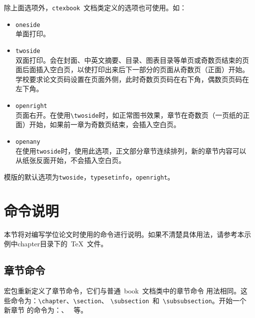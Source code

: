 除上面选项外，\texttt{ctexbook}~文档类定义的选项也可使用。如：
\begin{itemize}
\item \verb|oneside|\\
	单面打印。
\item \verb|twoside|\\
	双面打印。会在封面、中英文摘要、目录、图表目录等单页或奇数页结束的页面后面插入空白页，以使打印出来后下一部分的页面从奇数页（正面）开始。
	学校要求论文页码设置在页面外侧，此时奇数页页码在右下角，偶数页页码在左下角。
\item \verb|openright|\\
	页面右开。在使用\verb|\twoside|时，如正常图书效果，章节在奇数页（一页纸的正面）开始，如果前一章为奇数页结束，会插入空白页。
	\item \verb|openany|\\
	在使用\verb|twoside|时，使用此选项，正文部分章节连续排列，新的章节内容可以从纸张反面开始，不会插入空白页。
\end{itemize}

模版的默认选项为\verb|twoside|，\verb|typesetinfo|，\verb|openright|。
\section{命令说明}

本节将对编写学位论文时使用的命令进行说明。如果不清楚具体用法，请参考本示例中chapter目录下的~\TeX~文件。

\subsection{章节命令}

宏包重新定义了章节命令，它们与普通~book~文档类中的章节命令
用法相同。这些命令为：\verb|\chapter|、\verb|\section|、%
\verb|\subsection|~和~\verb|\subsubsection|。开始一个新章节
的命令为：、%
~等。

